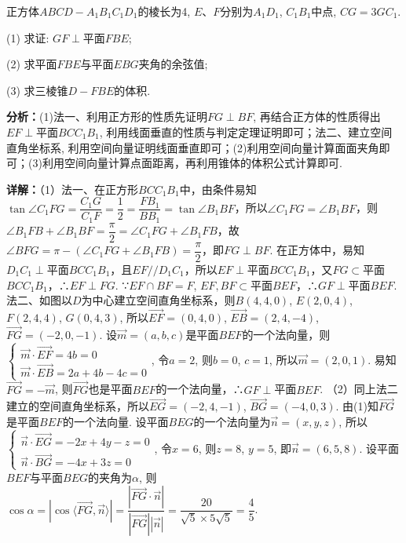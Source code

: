 \begin{question}[points=15]
正方体$ABCD - A_1B_1C_1D_1$的棱长为4, $E$、$F$分别为$A_1D_1$, $C_1B_1$中点, $CG = 3GC_1$.

(1) 求证: $GF \perp$平面$FBE$;

(2) 求平面$FBE$与平面$EBG$夹角的余弦值;

(3) 求三棱锥$D - FBE$的体积.
\begin{solution}

\textbf{分析：}(1)法一、利用正方形的性质先证明$FG \perp BF$, 再结合正方体的性质得出$EF \perp$平面$BCC_1B_1$, 利用线面垂直的性质与判定定理证明即可；法二、建立空间直角坐标系, 利用空间向量证明线面垂直即可；(2)利用空间向量计算面面夹角即可；(3)利用空间向量计算点面距离，再利用锥体的体积公式计算即可.

\textbf{详解：}（1）法一、在正方形$BCC_1B_1$中，由条件易知$\tan\angle C_1FG = \dfrac{C_1G}{C_1F} = \dfrac{1}{2} = \dfrac{FB_1}{BB_1} = \tan\angle B_1BF$，所以$\angle C_1FG = \angle B_1BF$，则$\angle B_1FB + \angle B_1BF = \dfrac{\pi}{2} = \angle C_1FG + \angle B_1FB$，故$\angle BFG = \pi - (\angle C_1FG + \angle B_1FB) = \dfrac{\pi}{2}$，即$FG \perp BF$. 在正方体中，易知$D_1C_1 \perp$平面$BCC_1B_1$，且$EF // D_1C_1$，所以$EF \perp$平面$BCC_1B_1$，又$FG \subset$平面$BCC_1B_1$，∴$EF \perp FG$. ∵$EF \cap BF = F$, $EF, BF \subset$平面$BEF$，∴$GF \perp$平面$BEF$.
法二、如图以$D$为中心建立空间直角坐标系，则$B(4,4,0)$, $E(2,0,4)$, $F(2,4,4)$, $G(0,4,3)$, 所以$\overrightarrow{EF} = (0,4,0)$, $\overrightarrow{EB} = (2,4,-4)$, $\overrightarrow{FG} = (-2,0,-1)$. 设$\vec{m} = (a,b,c)$是平面$BEF$的一个法向量，则$\begin{cases} \vec{m} \cdot \overrightarrow{EF} = 4b = 0 \\ \vec{m} \cdot \overrightarrow{EB} = 2a + 4b - 4c = 0 \end{cases}$, 令$a=2$, 则$b=0$, $c=1$, 所以$\vec{m} = (2,0,1)$. 易知$\overrightarrow{FG} = -\vec{m}$, 则$\overrightarrow{FG}$也是平面$BEF$的一个法向量，∴$GF \perp$平面$BEF$.
（2）同上法二建立的空间直角坐标系，所以$\overrightarrow{EG} = (-2,4,-1)$, $\overrightarrow{BG} = (-4,0,3)$. 由(1)知$\overrightarrow{FG}$是平面$BEF$的一个法向量. 设平面$BEG$的一个法向量为$\vec{n} = (x,y,z)$, 所以$\begin{cases} \vec{n} \cdot \overrightarrow{EG} = -2x + 4y - z = 0 \\ \vec{n} \cdot \overrightarrow{BG} = -4x + 3z = 0 \end{cases}$, 令$x=6$, 则$z=8$, $y=5$, 即$\vec{n} = (6,5,8)$. 设平面$BEF$与平面$BEG$的夹角为$\alpha$, 则$\cos\alpha = |\cos\langle\overrightarrow{FG},\vec{n}\rangle| = \dfrac{|\overrightarrow{FG}\cdot\vec{n}|}{|\overrightarrow{FG}||\vec{n}|} = \dfrac{20}{\sqrt{5} \times 5\sqrt{5}} = \dfrac{4}{5}$.

\end{solution}
\end{question}
